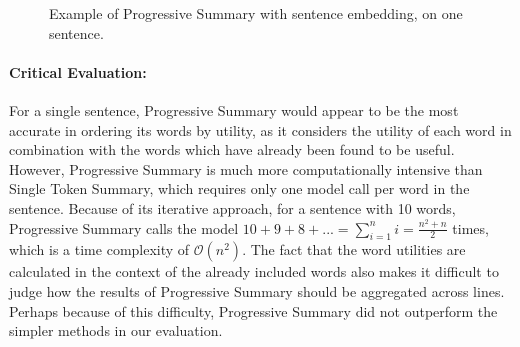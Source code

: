 \begin{figure}[H]
	
	\caption{Example of Progressive Summary with sentence embedding, on one sentence.}
	\label{fig:progressive-summary}
\end{figure}

\paragraph{Critical Evaluation:}
For a single sentence, Progressive Summary would appear to be the most accurate in ordering its words by utility, as it considers the utility of each word in combination with the words which have already been found to be useful.
However, Progressive Summary is much more computationally intensive than Single Token Summary, which requires only one model call per word in the sentence.
Because of its iterative approach, for a sentence with 10 words, Progressive Summary calls the model $10+9+8+... = \sum_{i=1}^{n}i = \frac{n^2 + n}{2}$ times, which is a time complexity of $\mathcal{O}(n^2)$.
The fact that the word utilities are calculated in the context of the already included words also makes it difficult to judge how the results of Progressive Summary should be aggregated across lines.
Perhaps because of this difficulty, Progressive Summary did not outperform the simpler methods in our evaluation.


